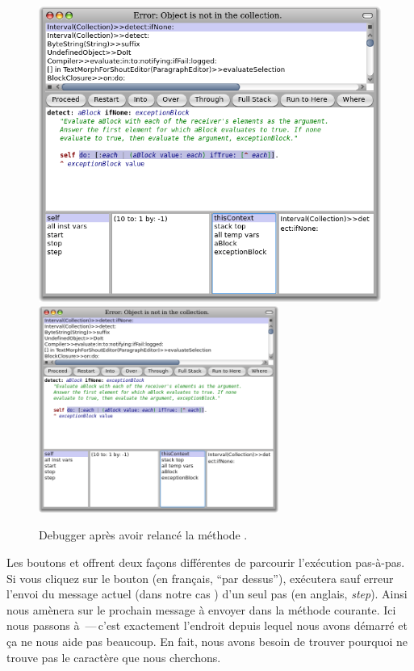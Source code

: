 \documentclass[a4paper,10pt,twoside]{book}
\begin{document}
\begin{figure}[btp]
	\begin{center}
	\ifluluelse
		{\includegraphics[width=\textwidth]{RestartDetectIfNone}}
		{\includegraphics[width=0.7\textwidth]{RestartDetectIfNone}}
	\end{center}
	\caption{Debugger après avoir relancé la méthode .}
\end{figure}

Les boutons  et  offrent deux façons différentes de 
parcourir l'exécution pas-à-pas.
Si vous cliquez sur le bouton  (en français, ``par dessus''),
\pharo exécutera sauf erreur l'envoi du message actuel (dans notre cas ) d'un
seul pas (en anglais, \emph{step}).
Ainsi  nous amènera sur le prochain message à envoyer dans la méthode courante.
Ici nous passons à \,---\,c'est exactement l'endroit depuis lequel nous avons démarré
et ça ne nous aide pas beaucoup.
En fait, nous avons besoin de trouver pourquoi  ne trouve pas
le caractère que nous cherchons.
\end{document}
